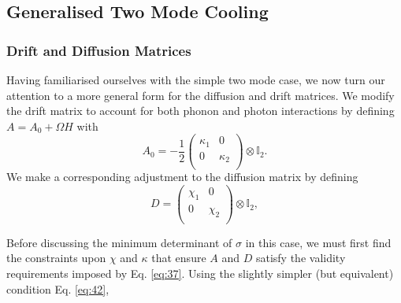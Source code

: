 \documentclass[11pt,a4paper]{article}
\numberwithin{equation}{section}
\begin{document}
	
 
	
	\subsection{Generalised Two Mode Cooling}
	\subsubsection{Drift and Diffusion Matrices}
	\label{sec:optodefs}	

	Having familiarised ourselves with the simple two mode case, we now turn our attention to a more general form for the diffusion and drift matrices. We modify the drift matrix to account for both phonon and photon interactions by defining $A = A_0 +\Omega H$ with
	\begin{equation*}
	A_0 = -\frac{1}{2} \begin{pmatrix}
	\kappa_1 & 0\\
	0 & \kappa_{2}\\
	\end{pmatrix} \otimes \mathbb{I}_2.
	\end{equation*} 
	We make a corresponding adjustment to the diffusion matrix by defining
	\begin{equation*}
	D = \begin{pmatrix}
	\chi_1 & 0\\
	0 & \chi_2\\
	\end{pmatrix} \otimes \mathbb{I}_2,
	\end{equation*}
	
	Before discussing the minimum determinant of $\sigma$ in this case, we must first find the constraints upon $\chi$ and $\kappa$ that ensure $A$ and $D$ satisfy the validity requirements imposed by Eq. \ref{eq:37}. Using the slightly simpler (but equivalent) condition Eq. \ref{eq:42}, 
	
\end{document}
